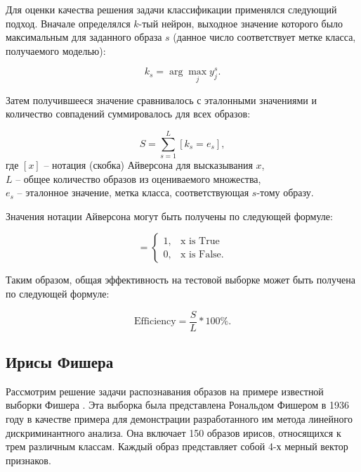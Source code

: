 Для оценки качества решения задачи классификации применялся следующий подход. Вначале определялся $k$-тый нейрон, выходное значение которого было максимальным для заданного образа $s$ (данное число соответствует метке класса, получаемого моделью):

\begin{equation}
  k_s = \arg \max_j y_j^s.
\end{equation}

Затем получившееся значение сравнивалось с эталонными значениями и количество совпадений суммировалось для всех образов:

\begin{equation}
  S = \sum_{s=1}^{L} [k_s = e_s],
\end{equation}
где $[x]$ -- нотация (скобка) Айверсона для высказывания $x$,\\
$L$ -- общее количество образов из оцениваемого множества,\\
$e_s$ -- эталонное значение, метка класса, соответствующая $s$-тому образу.

Значения нотации Айверсона могут быть получены по следующей формуле:

\begin{equation*}
    [x] = 
    \begin{cases}
        1, & \text{x is True} \\
        0, & \text{x is False}.
    \end{cases}
\end{equation*}

Таким образом, общая эффективность на тестовой выборке может быть получена по следующей формуле:

\begin{equation}
\text{Efficiency} = \frac{S}{L} * 100\%.
\end{equation}


\subsection{Ирисы Фишера}

Рассмотрим решение задачи распознавания образов на примере известной выборки Фишера \cite{Fisher}. Эта выборка была представлена Рональдом Фишером в 1936 году в качестве примера для демонстрации разработанного им метода линейного дискриминантного анализа. Она включает 150 образов ирисов, относящихся к трем различным классам. Каждый образ представляет собой 4-х мерный вектор признаков.

